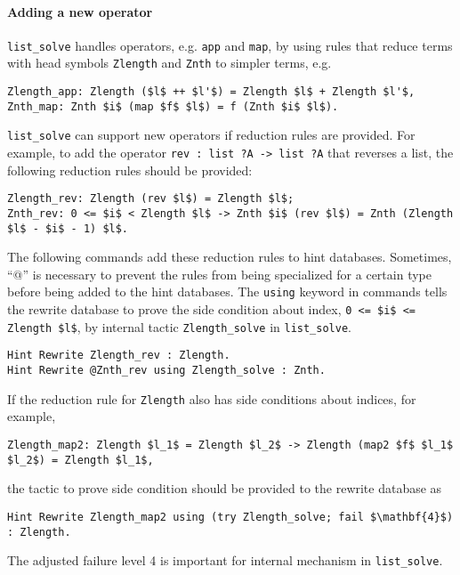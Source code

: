 \documentclass[12pt,fleqn,openany,oneside,showtrims]{memoir}
\begin{document}
\paragraph{Adding a new operator}
\lstinline{list_solve} handles operators, e.g. \lstinline{app} and \lstinline{map},
by using rules that reduce terms with head symbols \lstinline{Zlength} and \lstinline{Znth} to simpler terms,
e.g.
\begin{lstlisting}
Zlength_app: Zlength ($l$ ++ $l'$) = Zlength $l$ + Zlength $l'$,
Znth_map: Znth $i$ (map $f$ $l$) = f (Znth $i$ $l$).
\end{lstlisting}
\vspace{-\baselineskip}
\lstinline{list_solve} can support new operators if reduction rules are provided.
For example, to add the operator
\lstinline{rev : list ?A -> list ?A} that reverses a list,
the following reduction rules should be provided:
\begin{lstlisting}
Zlength_rev: Zlength (rev $l$) = Zlength $l$;
Znth_rev: 0 <= $i$ < Zlength $l$ -> Znth $i$ (rev $l$) = Znth (Zlength $l$ - $i$ - 1) $l$.
\end{lstlisting}
\vspace{-\baselineskip}
The following commands add these reduction rules to hint databases.
Sometimes, ``@'' is necessary to prevent the rules from being specialized for a certain type before being added to the hint databases.
The \lstinline{using} keyword in commands tells the rewrite database to prove the side condition about index, \lstinline{0 <= $i$ <= Zlength $l$}, by internal tactic \lstinline{Zlength_solve} in \lstinline{list_solve}.
\begin{lstlisting}
Hint Rewrite Zlength_rev : Zlength.
Hint Rewrite @Znth_rev using Zlength_solve : Znth.
\end{lstlisting}
\vspace{-\baselineskip}
If the reduction rule for \lstinline{Zlength} also has side conditions about indices, for example,
\begin{lstlisting}
Zlength_map2: Zlength $l_1$ = Zlength $l_2$ -> Zlength (map2 $f$ $l_1$ $l_2$) = Zlength $l_1$,
\end{lstlisting}
\vspace{-\baselineskip}
the tactic to prove side condition should be provided to the rewrite database as
\begin{lstlisting}
Hint Rewrite Zlength_map2 using (try Zlength_solve; fail $\mathbf{4}$) : Zlength.
\end{lstlisting}
\vspace{-\baselineskip}
The adjusted failure level 4 is important for internal mechanism in \lstinline{list_solve}.
\end{document}
